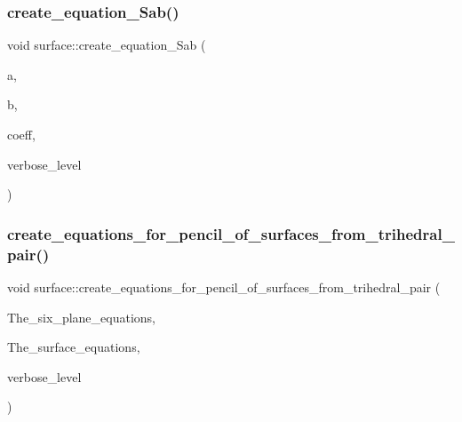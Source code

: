 \mbox{\label{classsurface_a8c521871432b1c3144d8af3dae119c5f}} 
\subsubsection{\texorpdfstring{create\+\_\+equation\+\_\+\+Sab()}{create\_equation\_Sab()}}
{\footnotesize\ttfamily void surface\+::create\+\_\+equation\+\_\+\+Sab (\begin{DoxyParamCaption}\item[{\mbox{\hyperlink{galois_8h_a09fddde158a3a20bd2dcadb609de11dc}{I\+NT}}}]{a,  }\item[{\mbox{\hyperlink{galois_8h_a09fddde158a3a20bd2dcadb609de11dc}{I\+NT}}}]{b,  }\item[{\mbox{\hyperlink{galois_8h_a09fddde158a3a20bd2dcadb609de11dc}{I\+NT}} $\ast$}]{coeff,  }\item[{\mbox{\hyperlink{galois_8h_a09fddde158a3a20bd2dcadb609de11dc}{I\+NT}}}]{verbose\+\_\+level }\end{DoxyParamCaption})}

\mbox{\label{classsurface_a3bdfac2b8808cb00eb11e54d38e45039}} 
\subsubsection{\texorpdfstring{create\+\_\+equations\+\_\+for\+\_\+pencil\+\_\+of\+\_\+surfaces\+\_\+from\+\_\+trihedral\+\_\+pair()}{create\_equations\_for\_pencil\_of\_surfaces\_from\_trihedral\_pair()}}
{\footnotesize\ttfamily void surface\+::create\+\_\+equations\+\_\+for\+\_\+pencil\+\_\+of\+\_\+surfaces\+\_\+from\+\_\+trihedral\+\_\+pair (\begin{DoxyParamCaption}\item[{\mbox{\hyperlink{galois_8h_a09fddde158a3a20bd2dcadb609de11dc}{I\+NT}} $\ast$}]{The\+\_\+six\+\_\+plane\+\_\+equations,  }\item[{\mbox{\hyperlink{galois_8h_a09fddde158a3a20bd2dcadb609de11dc}{I\+NT}} $\ast$}]{The\+\_\+surface\+\_\+equations,  }\item[{\mbox{\hyperlink{galois_8h_a09fddde158a3a20bd2dcadb609de11dc}{I\+NT}}}]{verbose\+\_\+level }\end{DoxyParamCaption})}

